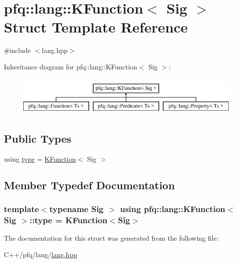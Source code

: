 \hypertarget{structpfq_1_1lang_1_1KFunction}{}\section{pfq\+:\+:lang\+:\+:K\+Function$<$ Sig $>$ Struct Template Reference}
\label{structpfq_1_1lang_1_1KFunction}


{\ttfamily \#include $<$lang.\+hpp$>$}

Inheritance diagram for pfq\+:\+:lang\+:\+:K\+Function$<$ Sig $>$\+:\begin{figure}[H]
\begin{center}
\leavevmode
\includegraphics[height=2.000000cm]{structpfq_1_1lang_1_1KFunction}
\end{center}
\end{figure}
\subsection*{Public Types}
\begin{DoxyCompactItemize}
\item 
using \hyperlink{structpfq_1_1lang_1_1KFunction_ac90a796d5d177b90cc663d1ab60acaa7}{type} = \hyperlink{structpfq_1_1lang_1_1KFunction}{K\+Function}$<$ Sig $>$
\end{DoxyCompactItemize}


\subsection{Member Typedef Documentation}
\subsubsection[{\texorpdfstring{type}{type}}]{\setlength{\rightskip}{0pt plus 5cm}template$<$typename Sig $>$ using {\bf pfq\+::lang\+::\+K\+Function}$<$ Sig $>$\+::{\bf type} =  {\bf K\+Function}$<$Sig$>$}\hypertarget{structpfq_1_1lang_1_1KFunction_ac90a796d5d177b90cc663d1ab60acaa7}{}\label{structpfq_1_1lang_1_1KFunction_ac90a796d5d177b90cc663d1ab60acaa7}


The documentation for this struct was generated from the following file\+:\begin{DoxyCompactItemize}
\item 
C++/pfq/lang/\hyperlink{lang_8hpp}{lang.\+hpp}\end{DoxyCompactItemize}
